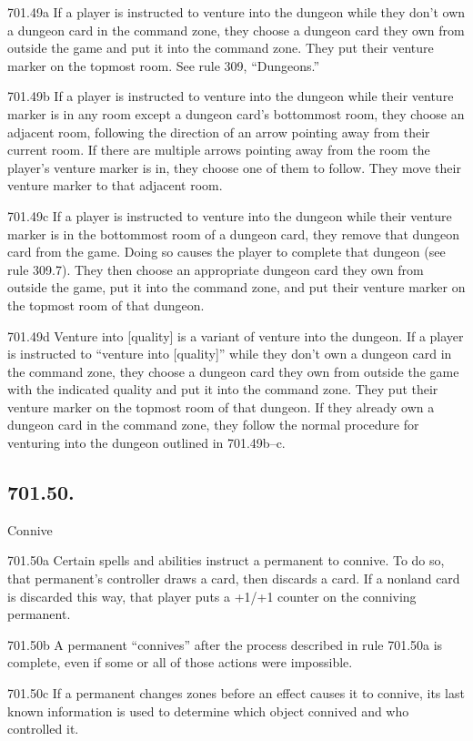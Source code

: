 701.49a If a player is instructed to venture into the dungeon while they don’t own a dungeon card in the command zone, they choose a dungeon card they own from outside the game and put it into the command zone. They put their venture marker on the topmost room. See rule 309, “Dungeons.”

701.49b If a player is instructed to venture into the dungeon while their venture marker is in any room except a dungeon card’s bottommost room, they choose an adjacent room, following the direction of an arrow pointing away from their current room. If there are multiple arrows pointing away from the room the player’s venture marker is in, they choose one of them to follow. They move their venture marker to that adjacent room.

701.49c If a player is instructed to venture into the dungeon while their venture marker is in the bottommost room of a dungeon card, they remove that dungeon card from the game. Doing so causes the player to complete that dungeon (see rule 309.7). They then choose an appropriate dungeon card they own from outside the game, put it into the command zone, and put their venture marker on the topmost room of that dungeon.

701.49d Venture into [quality] is a variant of venture into the dungeon. If a player is instructed to “venture into [quality]” while they don’t own a dungeon card in the command zone, they choose a dungeon card they own from outside the game with the indicated quality and put it into the command zone. They put their venture marker on the topmost room of that dungeon. If they already own a dungeon card in the command zone, they follow the normal procedure for venturing into the dungeon outlined in 701.49b–c.

\subsection*{701.50.}
Connive

701.50a Certain spells and abilities instruct a permanent to connive. To do so, that permanent’s controller draws a card, then discards a card. If a nonland card is discarded this way, that player puts a +1/+1 counter on the conniving permanent.

701.50b A permanent “connives” after the process described in rule 701.50a is complete, even if some or all of those actions were impossible.

701.50c If a permanent changes zones before an effect causes it to connive, its last known information is used to determine which object connived and who controlled it.

